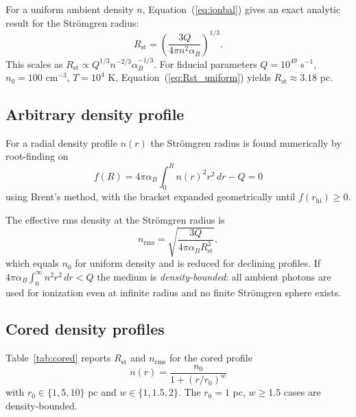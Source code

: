 \documentclass[12pt]{article}
\begin{document}
For a uniform ambient density $n$, Equation~(\ref{eq:ionbal}) gives an exact
analytic result for the Str\"omgren radius:
\begin{equation}
  \label{eq:Rst_uniform}
  R_\mathrm{st} = \left(\frac{3Q}{4\pi n^2 \alpha_B}\right)^{1/3}.
\end{equation}
This scales as $R_\mathrm{st}\propto Q^{1/3} n^{-2/3} \alpha_B^{-1/3}$.
For fiducial parameters $Q=10^{49}$ s$^{-1}$, $n_0=100$ cm$^{-3}$,
$T=10^4$ K, Equation~(\ref{eq:Rst_uniform}) yields
$R_\mathrm{st}\approx 3.18$ pc.

\subsection{Arbitrary density profile}

For a radial density profile $n(r)$ the Str\"omgren radius is found
numerically by root-finding on
\begin{equation}
  \label{eq:Rst_numeric}
  f(R) = 4\pi\alpha_B\int_0^R n(r)^2 r^2\, dr - Q = 0
\end{equation}
using Brent's method, with the bracket expanded geometrically until
$f(r_\mathrm{hi}) \ge 0$.

The effective rms density at the Str\"omgren radius is
\begin{equation}
  \label{eq:nrms}
  n_\mathrm{rms} = \sqrt{\frac{3Q}{4\pi\alpha_B R_\mathrm{st}^3}},
\end{equation}
which equals $n_0$ for uniform density and is reduced for declining profiles.
If $4\pi\alpha_B\int_0^\infty n^2 r^2\, dr < Q$ the medium is
\emph{density-bounded}: all ambient photons are used for ionization even at
infinite radius and no finite Str\"omgren sphere exists.

\subsection{Cored density profiles}

Table~\ref{tab:cored} reports $R_\mathrm{st}$ and $n_\mathrm{rms}$ for the
cored profile
\begin{equation}
  n(r) = \frac{n_0}{1+(r/r_0)^w}
\end{equation}
with $r_0\in\{1,5,10\}$ pc and $w\in\{1,1.5,2\}$.  The $r_0=1$ pc,
$w\ge 1.5$ cases are density-bounded.
\end{document}
